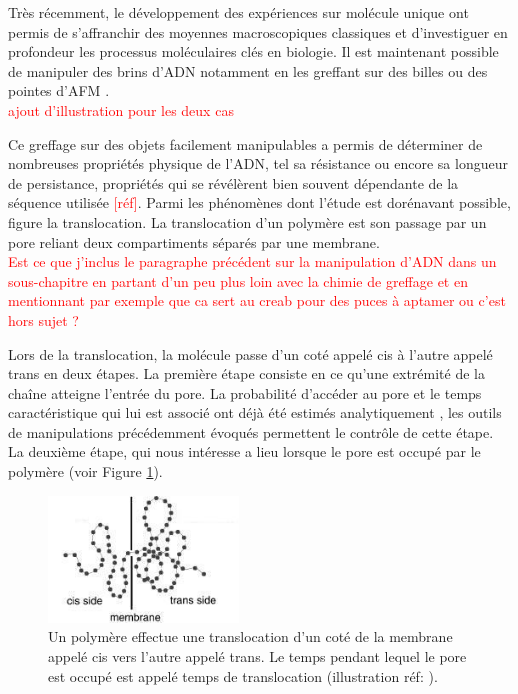 \documentclass[a4paper,11pt]{article}
\begin{document}
Très récemment, le développement des expériences sur molécule unique ont permis de s'affranchir des moyennes macroscopiques classiques et d'investiguer en profondeur les processus moléculaires clés en biologie. Il est maintenant possible de manipuler des brins d'ADN notamment en les greffant sur des billes ou des pointes d'AFM \cite{keyser}.\\

\textcolor{red}{ajout d'illustration pour les deux cas}

Ce greffage sur des objets facilement manipulables a permis de déterminer de nombreuses propriétés physique de l'ADN, tel sa résistance ou encore sa longueur de persistance, propriétés qui se révélèrent bien souvent dépendante de la séquence utilisée \textcolor{red}{[réf]}. Parmi les phénomènes dont l'étude est dorénavant possible, figure la translocation. La translocation d'un polymère est son passage par un pore reliant deux compartiments séparés par une membrane.\\

\textcolor{red}{Est ce que j'inclus le paragraphe précédent sur la manipulation d'ADN dans un sous-chapitre en partant d'un peu plus loin avec la chimie de greffage et en mentionnant par exemple que ca sert au creab pour des puces à aptamer ou c'est hors sujet ?}

 Lors de la translocation, la molécule passe d'un coté appelé cis à l'autre appelé trans en deux étapes. La première étape consiste en ce qu'une extrémité de la chaîne atteigne l'entrée du pore. La probabilité d'accéder au pore et le temps caractéristique qui lui est associé ont déjà été estimés analytiquement \cite{milchev}, les outils de manipulations précédemment évoqués permettent le contr\^{o}le  de cette étape. La deuxième étape, qui nous intéresse a lieu lorsque le pore est occupé par le polymère (voir Figure \ref{transloc}). \\

\begin{figure}[H]
\begin{center}
\includegraphics[width=0.45\textwidth]{transloc.jpg}

\caption{Un polymère effectue une translocation d'un coté de la membrane appelé cis vers l'autre appelé trans. Le temps pendant lequel le pore est occupé est appelé temps de translocation (illustration réf: \cite{sung}).}
\label{transloc}
\end{center}
\end{figure}
\end{document}
